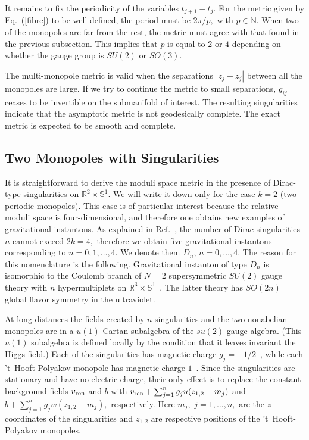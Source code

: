 \documentclass[a4paper,12pt, amsfonts, amssymb]{article}
\newcommand{\RR}{{\mathbb R}}
\newcommand{\NN}{{\mathbb N}}
\renewcommand{\SS}{{\mathbb S}}
\newcommand{\vr}{v_{{\rm ren}}}
\begin{document}
It remains to fix the periodicity of the variables $t_{j+1}-t_j.$
For the metric given by Eq.~(\ref{fibre}) to be well-defined,
the period must be $2\pi/p,$ with $p\in\NN.$
When two of the monopoles are far from the rest, the
metric must agree with that found in the previous subsection.
This implies that $p$ is equal to $2$ or $4$ depending on whether the
gauge group is $SU(2)$ or $SO(3).$

The multi-monopole metric is valid when the separations $|z_j-z_j|$
between all the monopoles are large. If we try to continue the metric to
small separations, $g_{ij}$ ceases to be invertible on the submanifold of interest. The resulting singularities indicate that the asymptotic
metric is not geodesically complete. The exact metric is expected to be
smooth and complete.

\subsection{Two Monopoles with Singularities}

It is straightforward to derive the moduli space metric in the
presence of Dirac-type singularities on $\RR^2\times\SS^1$.
We will write it down only for the case $k=2$ (two periodic monopoles).
This case is of particular interest because the relative moduli space is
four-dimensional, and therefore one obtains new examples of gravitational
instantons. As explained in Ref.~\cite{ustwo}, the number of Dirac singularities
$n$ cannot exceed $2k=4,$ therefore we obtain five gravitational
instantons corresponding to $n=0,1,\ldots,4.$ We denote them $D_n$,
$n=0,\ldots,4.$ The reason for this nomenclature is the following.
Gravitational instanton of type $D_n$ is isomorphic to the Coulomb branch
of $N=2$ supersymmetric $SU(2)$ gauge theory with $n$ hypermultiplets
on $\RR^3\times\SS^1$~\cite{ustwo}. The latter theory has $SO(2n)$ global flavor symmetry in the ultraviolet.

At long distances the fields created by $n$ singularities and the two
nonabelian monopoles are in a $u(1)$ Cartan subalgebra of the $su(2)$ gauge algebra. (This $u(1)$ subalgebra is defined locally by the condition that it
leaves invariant the Higgs field.)
Each of the singularities has magnetic charge
$g_j=-1/2$~\cite{ustwo}, while each 't~Hooft-Polyakov
monopole has magnetic charge $1$~\cite{ustwo}.
Since the singularities are stationary and
have no electric charge, their only effect is to replace the constant
background fields $\vr$ and $b$ with $\vr+\sum_{j=1}^n g_j u(z_{1,2}-m_j)$ and
$b+\sum_{j=1}^n g_j w(z_{1,2}-m_j),$ respectively. Here $m_j,$ $j=1,\ldots,n,$
are the $z$-coordinates of the singularities and $z_{1,2}$ are respective positions of
the 't~Hooft-Polyakov monopoles.
\end{document}
